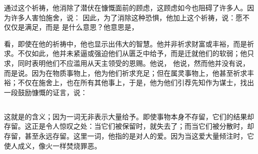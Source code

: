 \par

通过这个祈祷，他消除了潜伏在慷慨面前的顾虑，这顾虑如今也阻碍了许多人。因为许多人害怕施舍，说： 因此，为了消除这种恐惧，他加上这个祈祷，说：愿不仅仅是满足，而是 是什么意思？他意思是，\par

\par

看，即使在他的祈祷中，他也显示出伟大的智慧。他并非祈求财富或丰裕，而是祈求。不仅如此，他并未紧逼或强迫他们从匮乏中给予，而是迁就他们的软弱；他只求，同时表明他们不应滥用从天主领受的恩赐。他说， 他说，然而他并没有说，而是说。因为在物质事物上，他为他们祈求充足；但在属灵事物上，他甚至祈求丰裕；不仅在施舍上，也在所有其他事上，于是，他为他们引荐先知作为谋士，找出一段鼓励慷慨的证言，说：\par


\subsection{}

\par

这就是的含义；因为一词无非表示大量给予。即使事物本身不存留，它们的结果却存留。这正是令人惊叹之处：当它们被保留时，就失去了；而当它们被分散时，却存留，甚至永远存留。这里一词，他指的是对人的爱。因为当这爱大量倾注时，它使人成义，像火一样焚烧罪恶。\par

